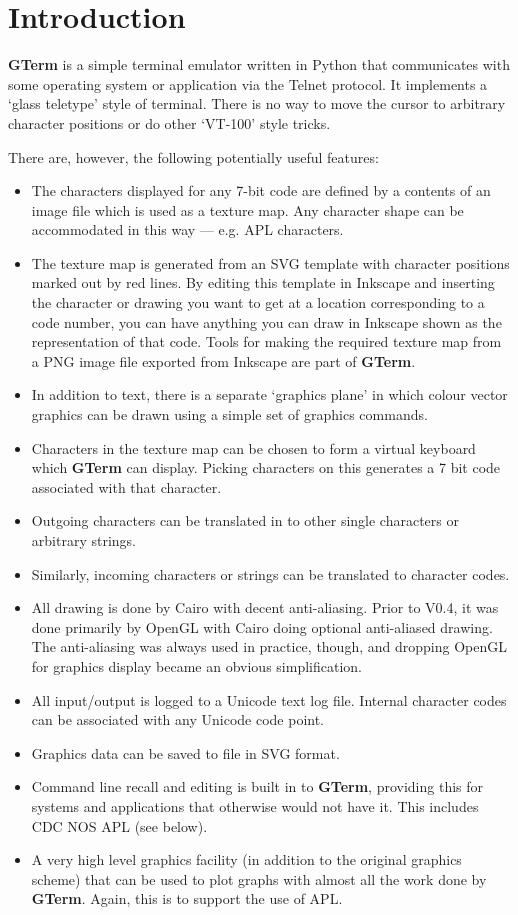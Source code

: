 \documentclass[a4paper,twoside,11pt]{article}
\newcommand{\newpara}{\par\vspace{4mm}\noindent}
\newcommand{\textbfc}[1]{\textcolor{OurRed}{#1}}
\begin{document}
\section{Introduction}
\textbf{GTerm} is a simple terminal emulator written in Python that communicates with some operating system
or application via the Telnet protocol. It implements a `glass teletype' style of terminal. There is
no way to move the cursor to arbitrary character positions or do other `VT-100' style tricks.
\newpara
There are, however, the following potentially useful features:
\begin{itemize}
\item The characters displayed for any 7-bit code are defined by a contents of an image file
      which is used as a texture map. \textbfc{Any character shape can be accommodated in this way --- e.g. APL characters}.
\item The texture map is generated from an SVG template with character positions marked out by red lines.
      By editing this template in Inkscape and inserting the character or drawing you want to get at a
      location corresponding to a code number, you can have anything you can draw in Inkscape shown as
      the representation of that code. Tools for making the required texture map from a PNG image
      file exported from Inkscape are part of \textbf{GTerm}.
\item \textbfc{In addition to text, there is a separate `graphics plane' in which colour vector graphics can
      be drawn using a simple set of graphics commands}. 
\item \textbfc{Characters in the texture map can be chosen to form a virtual keyboard which \textbf{GTerm} can display}.
      Picking characters on this generates a 7 bit code associated with that character. 
\item Outgoing characters can be translated in to other single characters or arbitrary strings.
\item Similarly, incoming characters or strings can be translated to character codes.
\item All drawing is done by Cairo with decent anti-aliasing. Prior to V0.4, it was done primarily by
	OpenGL with Cairo doing optional anti-aliased drawing. The anti-aliasing was always used in practice, though,
	and dropping OpenGL for graphics display became an obvious simplification.
\item All input/output is logged to a Unicode text log file. Internal character codes can be associated
      with any Unicode code point.
\item Graphics data can be saved to file in SVG format. 
\item Command line recall and editing is built in to \textbf{GTerm}, providing this for systems and
applications that otherwise would not have it. This includes CDC NOS APL (see below). 
\item A very high level graphics facility (in addition to the original graphics
scheme) that can be used to plot graphs with almost all the work done by \textbf{GTerm}. Again, this is to support
the use of APL.
\end{itemize}
\end{document}

